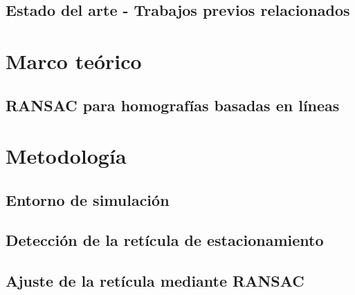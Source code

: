\documentclass[10pt,letterpaper,final]{article}
\begin{document}
\subsection{Estado del arte - Trabajos previos relacionados}


% 

\clearpage
\section{Marco teórico}\label{chap:marco-teorico}


\subsection{RANSAC para homografías basadas en líneas}\label{sec:ransac-teorico}


\clearpage
\section{Metodología}\label{chap:metodologia}


\subsection{Entorno de simulación}\label{sec:carla}


\subsection{Detección de la retícula de estacionamiento}\label{sec:metodo-reticula}


\subsection{Ajuste de la retícula mediante RANSAC}\label{sec:metodo-ransac}


%
\end{document}
